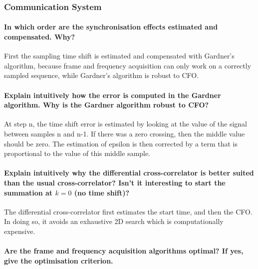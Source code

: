\subsubsection{Communication System}


\paragraph{In which order are the synchronisation effects estimated and compensated. Why?} First the sampling time shift is estimated and compensated with Gardner's algorithm, because frame and frequency acquisition can only work on a correctly sampled sequence, while Gardner's algorithm is robust to CFO.


\paragraph{Explain intuitively how the error is computed in the Gardner algorithm. Why is the
Gardner algorithm robust to CFO?} At step n, the time shift error is estimated by looking at the value of the signal between samples n and n-1. If there was a zero crossing, then the middle value should be zero. The estimation of epsilon is then corrected by a term that is proportional to the value of this middle sample.

\paragraph{Explain intuitively why the differential cross-correlator is better suited than the usual cross-correlator? Isn’t it interesting to start the summation at $k = 0$ (no time shift)?}
The differential cross-correlator first estimates the start time, and then the CFO. In doing so, it avoids an exhaustive 2D search which is computationally expensive.

\paragraph{Are the frame and frequency acquisition algorithms optimal? If yes, give the optimisation criterion.}
